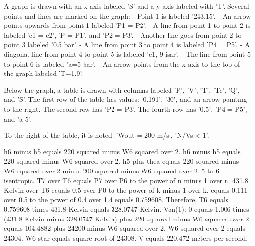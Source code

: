 A graph is drawn with an x-axis labeled 'S' and a y-axis labeled with 'T'. Several points and lines are marked on the graph:
- Point 1 is labeled '243.15'.
- An arrow points upwards from point 1 labeled 'P1 = P2'.
- A line from point 1 to point 2 is labeled 'c1 = c2', 'P = P1', and 'P2 = P3'.
- Another line goes from point 2 to point 3 labeled '0.5 bar'.
- A line from point 3 to point 4 is labeled 'P4 = P5'.
- A diagonal line from point 4 to point 5 is labeled 'c1, 9 isar'.
- The line from point 5 to point 6 is labeled 'a=5 bar'.
- An arrow points from the x-axis to the top of the graph labeled 'T=1.9'.

Below the graph, a table is drawn with columns labeled 'P', 'V', 'T', 'Tc', 'Q', and 'S'. The first row of the table has values: '0.191', '30', and an arrow pointing to the right. The second row has 'P2 = P3'. The fourth row has '0.5', 'P4 = P5', and 'a 5'.

To the right of the table, it is noted: 'Wout = 200 m/s', 'N/Vs < 1'.

h6 minus h5 equals 220 squared minus W6 squared over 2.  
h6 minus h5 equals 220 squared minus W6 squared over 2.  
h5 plus thea equals 220 squared minus W6 squared over 2 minus 200 squared minus W6 squared over 2.  
5 to 6 isentropic.  
T7 over T6 equals P7 over P6 to the power of n minus 1 over n.  
431.8 Kelvin over T6 equals 0.5 over P0 to the power of k minus 1 over k.  
equals 0.111 over 0.5 to the power of 0.4 over 1.4 equals 0.759608.  
Therefore, T6 equals 0.759608 times 431.8 Kelvin equals 328.0747 Kelvin.  
Von(1): 0 equals 1.006 times (431.8 Kelvin minus 328.0747 Kelvin) plus 220 squared minus W6 squared over 2 equals 104.4882 plus 24200 minus W6 squared over 2.  
W6 squared over 2 equals 24304.  
W6 star equals square root of 24308.  
V equals 220.472 meters per second.